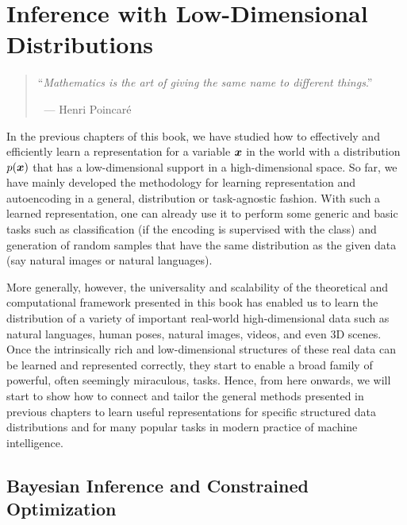 \documentclass[../../book-main.tex]{subfiles}
\begin{document}
\chapter{Inference with Low-Dimensional Distributions}
\label{ch:conditional-inference}

\begin{quote}

\hfill    ``{\em Mathematics is the art of giving the same name to different things}.''

$~$ \hfill --- Henri Poincar\'e 
\end{quote}
\vspace{5mm}


In the previous chapters of this book, we have studied how to effectively and efficiently learn a representation for a variable $\bm{x}$ in the world with a distribution $p(\bm{x})$ that has a low-dimensional support in a high-dimensional space.  So far, we have mainly developed the methodology for learning representation and autoencoding in a general, distribution or task-agnostic fashion. With such a learned representation, one can already use it to perform some generic and basic tasks such as classification (if the encoding is supervised with the class) and generation of random samples that have the same distribution as the given data (say natural images or natural languages). 

More generally, however, the universality and scalability of the theoretical and computational framework presented in this book has enabled us to learn the distribution of a variety of important real-world high-dimensional data such as natural languages, human poses, natural images, videos, and even 3D scenes. Once the intrinsically rich and low-dimensional structures of these real data can be learned and represented correctly, they start to enable a broad family of powerful, often seemingly miraculous, tasks. Hence, from here onwards, we will start to show how to connect and tailor the general methods presented in previous chapters to learn useful representations for specific structured data distributions and for many popular tasks in modern practice of machine intelligence. 

\section{Bayesian Inference and Constrained Optimization}
\end{document}
